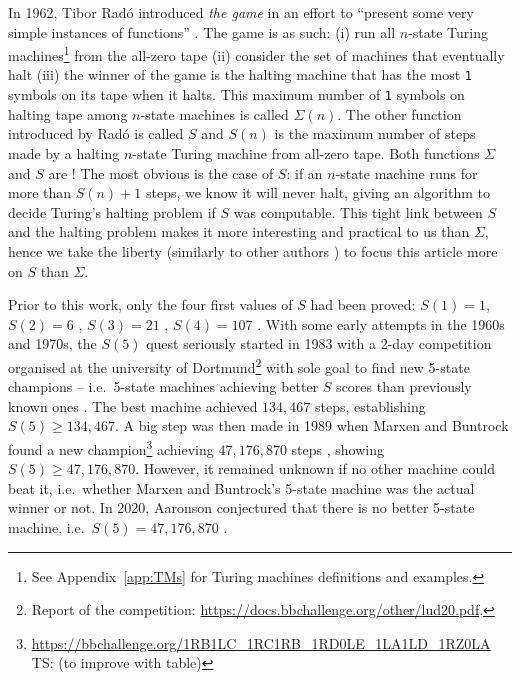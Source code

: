 \documentclass[a4paper,british]{article}
\theoremstyle{definition} %
\numberwithin{equation}{section}
\theoremstyle{definition} %
\newcommand{\ts}[1]{{\color{red}#1}}
\newcommand{\sone}{\texttt{1}\xspace}
\newcommand{\BBtheFifth}{47{,}176{,}870}
\newcommand{\radofull}{Tibor Rad\'o\xspace}
\newcommand{\rado}{Rad\'o\xspace}
\begin{document}
\newcommand{\ie}{i.e.~}

In 1962, \radofull introduced \textit{the \BBfull game} in an effort to ``present some very simple instances of \noncomput functions'' \cite{Rado_1962}. The game is as such: (i) run all $n$-state Turing machines\footnote{See Appendix~\ref{app:TMs} for Turing machines definitions and examples.} from the all-zero tape (ii) consider the set of machines that eventually halt (iii) the winner of the game is the halting machine that has the most \sone symbols on its tape when it halts. This maximum number of \sone symbols on halting tape among $n$-state machines is called $\Sigma(n)$. The other function introduced by \rado is called $S$ and $S(n)$ is the maximum number of steps made by a halting $n$-state Turing machine from all-zero tape. Both functions $\Sigma$ and $S$ are \noncomput! The most obvious is the case of $S$: if an $n$-state machine runs for more than $S(n)+1$ steps, we know it will never halt, giving an algorithm to decide Turing's halting problem if $S$ was computable. This tight link between $S$ and the halting problem makes it more interesting and practical to us than $\Sigma$, hence we take the liberty (similarly to other authors \cite{BusyBeaverFrontier,otherexamples?}) to focus this article more on
$S$ than $\Sigma$.

Prior to this work, only the four first values of $S$ had been proved: $S(1)=1$, $S(2)=6$ \cite{Rado_1962}, $S(3) = 21$ \cite{Lin1963}, $S(4) = 107$ \cite{Brady83}. With some early attempts in the 1960s and 1970s, the $S(5)$ quest seriously started in 1983 with a 2-day competition organised at the university of Dortmund\footnote{Report of the competition: \url{https://docs.bbchallenge.org/other/lud20.pdf}.} with sole goal to find new 5-state champions -- \ie 5-state machines achieving better $S$ scores than previously known ones \cite{PMichel_website,michel2019busy}. The best machine achieved $134,467$ steps, establishing $S(5) \geq 134,467$. A big step was then made in 1989 when Marxen and Buntrock found a new champion\footnote{\url{https://bbchallenge.org/1RB1LC_1RC1RB_1RD0LE_1LA1LD_1RZ0LA} \ts{TS: (to improve with table)}} achieving $\BBtheFifth$ steps \cite{Marxen_1990}, showing $S(5) \geq \BBtheFifth$. However, it remained unknown if no other machine could beat it, \ie whether Marxen and Buntrock's 5-state machine was the actual winner or not. In 2020, Aaronson conjectured that there is no better 5-state machine, \ie $S(5) = \BBtheFifth$ \cite{BusyBeaverFrontier}.
\end{document}
